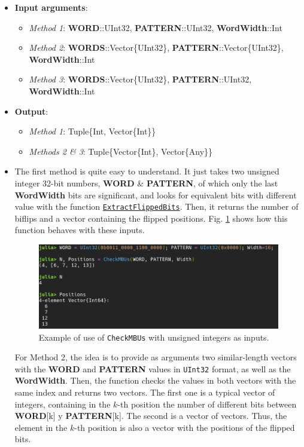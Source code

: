 \begin{itemize}
	\item \textbf{Input arguments}:
	\begin{itemize}
		\item \textit{Method 1}: \textbf{WORD}::UInt32, \textbf{PATTERN}::UInt32, \textbf{WordWidth}::Int
		\item \textit{Method 2}: \textbf{WORDS}::Vector\{UInt32\}, \textbf{PATTERN}::Vector\{UInt32\}, \\ \textbf{WordWidth}::Int
		\item \textit{Method 3}:  \textbf{WORDS}::Vector\{UInt32\}, \textbf{PATTERN}::UInt32, \textbf{WordWidth}::Int
	\end{itemize}
	\item \textbf{Output}: 
		\begin{itemize}
			\item \textit{Method 1}: Tuple\{Int, Vector\{Int\}\}
			\item \textit{Methods 2 \& 3}: Tuple\{Vector\{Int\}, Vector\{Any\}\}
		\end{itemize}
	\item The first method is quite easy to understand. It just takes two unsigned integer 32-bit numbers, \textbf{WORD} \& \textbf{PATTERN}, of which only the last \textbf{WordWidth} bits are significant, and looks for equivalent bits with different value with the function \hyperref[Func:ExtractFlippedBits]{\texttt{ExtractFlippedBits}}. Then, it returns the number of biflips and a vector containing the flipped positions. Fig. \ref{fig:Example_CheckMBUs_M1} shows how this function behaves with these inputs.
	
	\begin{figure}[h!]
		\centering
		\includegraphics[width=0.75\columnwidth]{fig/functions/CheckMBUs_M1.png}
		\caption{Example of use of \texttt{CheckMBUs} with unsigned integers as inputs.}
		\label{fig:Example_CheckMBUs_M1}
	\end{figure}

	For Method 2, the idea is to provide as arguments two similar-length vectors with the \textbf{WORD} and \textbf{PATTERN} values in \texttt{UInt32} format, as well as the \textbf{WordWidth}. Then, the function checks the values in both vectors with the same index and returns two vectors. The first one is a typical vector of integers, containing in the \(k\)-th position the number of different bits between \textbf{WORD}[k] y \textbf{PATTERN}[k]. The second is a vector of vectors. Thus, the element in the \(k\)-th position is also a vector with the positions of the flipped bits. 
	

\end{itemize}
